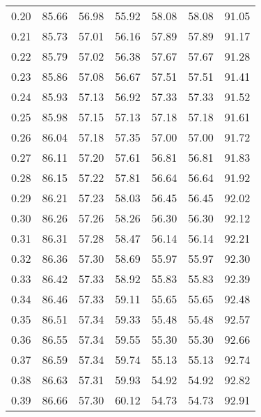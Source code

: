 \begin{tabular}{|c|c|c|c|c|c|c|}
      0.20 &     85.66 &     56.98 &      55.92 &   58.08 &      58.08 &         91.05 \\
      0.21 &     85.73 &     57.01 &      56.16 &   57.89 &      57.89 &         91.17 \\
      0.22 &     85.79 &     57.02 &      56.38 &   57.67 &      57.67 &         91.28 \\
      0.23 &     85.86 &     57.08 &      56.67 &   57.51 &      57.51 &         91.41 \\
      0.24 &     85.93 &     57.13 &      56.92 &   57.33 &      57.33 &         91.52 \\
      0.25 &     85.98 &     57.15 &      57.13 &   57.18 &      57.18 &         91.61 \\
      0.26 &     86.04 &     57.18 &      57.35 &   57.00 &      57.00 &         91.72 \\
      0.27 &     86.11 &     57.20 &      57.61 &   56.81 &      56.81 &         91.83 \\
      0.28 &     86.15 &     57.22 &      57.81 &   56.64 &      56.64 &         91.92 \\
      0.29 &     86.21 &     57.23 &      58.03 &   56.45 &      56.45 &         92.02 \\
      0.30 &     86.26 &     57.26 &      58.26 &   56.30 &      56.30 &         92.12 \\
      0.31 &     86.31 &     57.28 &      58.47 &   56.14 &      56.14 &         92.21 \\
      0.32 &     86.36 &     57.30 &      58.69 &   55.97 &      55.97 &         92.30 \\
      0.33 &     86.42 &     57.33 &      58.92 &   55.83 &      55.83 &         92.39 \\
      0.34 &     86.46 &     57.33 &      59.11 &   55.65 &      55.65 &         92.48 \\
      0.35 &     86.51 &     57.34 &      59.33 &   55.48 &      55.48 &         92.57 \\
      0.36 &     86.55 &     57.34 &      59.55 &   55.30 &      55.30 &         92.66 \\
      0.37 &     86.59 &     57.34 &      59.74 &   55.13 &      55.13 &         92.74 \\
      0.38 &     86.63 &     57.31 &      59.93 &   54.92 &      54.92 &         92.82 \\
      0.39 &     86.66 &     57.30 &      60.12 &   54.73 &      54.73 &         92.91 \\

\end{tabular}
